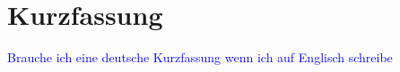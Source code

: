 \chapter{Kurzfassung}
\textcolor{blue}{Brauche ich eine deutsche Kurzfassung wenn ich auf Englisch schreibe}
